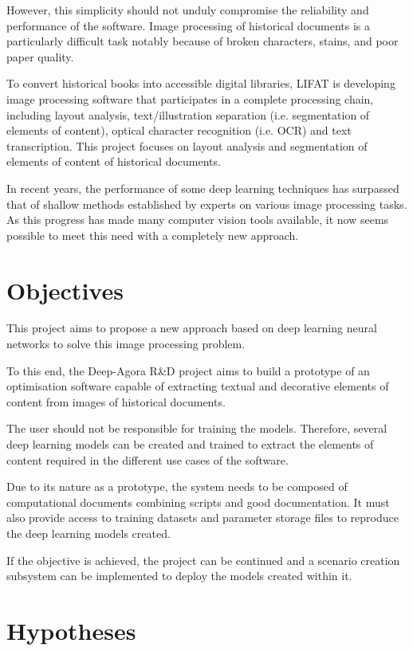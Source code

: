 \documentclass{polytech/polytech}
\numberwithin{figure}{chapter}
\begin{document}
However, this simplicity should not unduly compromise the reliability and performance of the software.
Image processing of historical documents is a particularly difficult task notably because of broken characters, stains, and poor paper quality.

To convert historical books into accessible digital libraries, LIFAT is developing image processing software that participates in a complete processing chain, including layout analysis, text/illustration separation (i.e. segmentation of elements of content), optical character recognition (i.e. OCR) and text transcription.
This project focuses on layout analysis and segmentation of elements of content of historical documents.

In recent years, the performance of some deep learning techniques has surpassed that of shallow methods established by experts on various image processing tasks.
As this progress has made many computer vision tools available, it now seems possible to meet this need with a completely new approach.


\section{Objectives}

This project aims to propose a new approach based on deep learning neural networks to solve this image processing problem.

To this end, the Deep-Agora R\&D project aims to build a prototype of an optimisation software capable of extracting textual and decorative elements of content from images of historical documents.

The user should not be responsible for training the models.
Therefore, several deep learning models can be created and trained to extract the elements of content required in the different use cases of the software.

Due to its nature as a prototype, the system needs to be composed of computational documents combining scripts and good documentation.
It must also provide access to training datasets and parameter storage files to reproduce the deep learning models created.

If the objective is achieved, the project can be continued and a scenario creation subsystem can be implemented to deploy the models created within it.


\section{Hypotheses}
\end{document}
